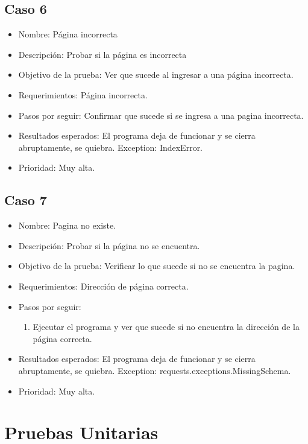 \documentclass[conference]{IEEEtran}
\begin{document}
\subsection*{Caso 6}
\begin{itemize}
\item Nombre: Página incorrecta
\item Descripción: Probar si la página es incorrecta
\item Objetivo de la prueba: Ver que sucede al ingresar a una página incorrecta.
\item Requerimientos: Página incorrecta.
\item Pasos por seguir: Confirmar que sucede si se ingresa a una pagina incorrecta.
\item Resultados esperados: El programa deja de funcionar y se cierra abruptamente, se quiebra. Exception: IndexError.
\item Prioridad: Muy alta.
\end{itemize}

\subsection*{Caso 7}

\begin{itemize}
\item Nombre: Pagina no existe.
\item Descripción: Probar si la página no se encuentra.
\item Objetivo de la prueba: Verificar lo que sucede si no se encuentra la pagina.
\item Requerimientos: Dirección de página correcta.
\item Pasos por seguir: 
\begin{enumerate}
\item Ejecutar el programa y ver que sucede si no encuentra la dirección de la página correcta.
\end{enumerate}
\item Resultados esperados: El programa deja de funcionar y se cierra abruptamente, se quiebra. Exception: requests.exceptions.MissingSchema.
\item Prioridad: Muy alta. 
\end{itemize}

\section{Pruebas Unitarias}
\end{document}
